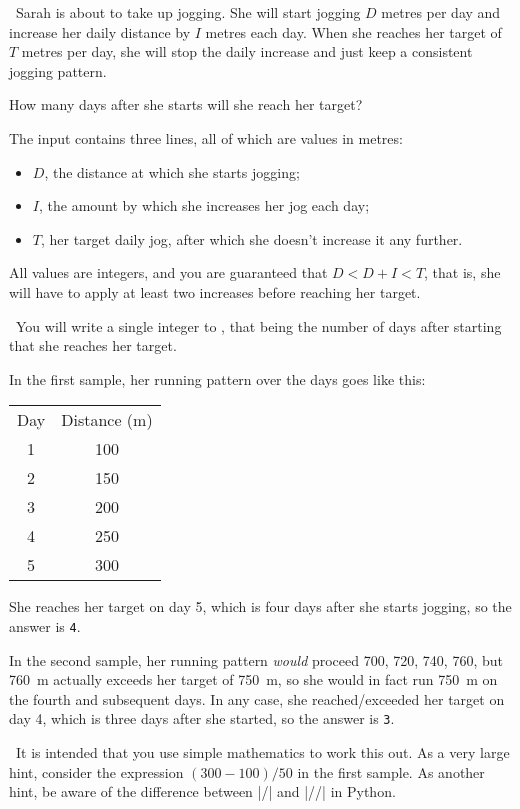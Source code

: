 

\Question\ Sarah is about to take up jogging. She will start jogging $D$ metres per day
and increase her daily distance by $I$ metres each day. When she reaches her target of $T$
metres per day, she will stop the daily increase and just keep a consistent jogging
pattern.

How many days after she starts will she reach her target?

\Input

The input contains three lines, all of which are values in metres:
\begin{itemize}
  \item $D$, the distance at which she starts jogging;
  \item $I$, the amount by which she increases her jog each day;
  \item $T$, her target daily jog, after which she doesn't increase it any further.
\end{itemize}

All values are integers, and you are guaranteed that $D < D+I < T$, that is, she will have
to apply at least two increases before reaching her target.

\Output\ You will write a single integer to \OUT, that being the number of days after
starting that she reaches her target.

\Sample



\Explanation In the first sample, her running pattern over the days goes like this:
\begin{center}
  \begin{tabular}{cc}
    Day & Distance (m) \\
    1   & 100\\
    2   & 150\\
    3   & 200\\
    4   & 250\\
    5   & 300
  \end{tabular}
\end{center}

She reaches her target on day 5, which is four days after she starts jogging, so the
answer is \texttt{4}.

In the second sample, her running pattern \emph{would} proceed 700, 720, 740, 760, but
\SI{760}{\m} actually exceeds her target of \SI{750}{\m}, so she would in fact run
\SI{750}{\m} on the fourth and subsequent days. In any case, she reached/exceeded her
target on day 4, which is three days after she started, so the answer is \texttt{3}.

\Scratch\ It is intended that you use simple mathematics to work this out. As a very large
hint, consider the expression $(300 - 100)/50$ in the first sample. As another hint, be
aware of the difference between \pycode|/| and \pycode|//| in Python.

